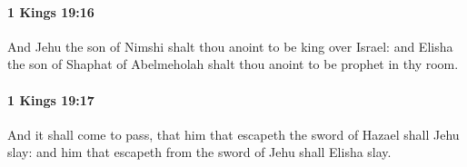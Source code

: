 		\paragraph{1 Kings 19:16} %
			\label{1KINGS-19-16}

			And Jehu the son of Nimshi shalt thou anoint to be king over Israel: and Elisha the son of Shaphat of Abelmeholah shalt thou anoint to be prophet in thy room.


		\paragraph{1 Kings 19:17} %
			\label{1KINGS-19-17}

			And it shall come to pass, that him that escapeth the sword of Hazael shall Jehu slay: and him that escapeth from the sword of Jehu shall Elisha slay.


